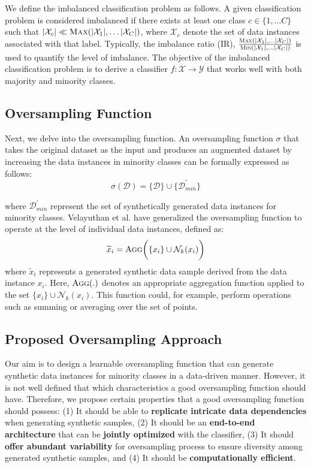 We define the imbalanced classification problem as follows. A given classification problem is considered imbalanced if there exists at least one class $c \in \{1, \ldots C \}$ such that $|\mathcal{X}_c| \ll \textsc{Max}(|\mathcal{X}_1|, \dots |\mathcal{X}_C|)$, where $\mathcal{X}_c$ denote the set of data instances associated with that label. Typically, the imbalance ratio (IR), $\frac{\textsc{Max}(|\mathcal{X}_1|, \dots |\mathcal{X}_C|)}{\textsc{Min}(|\mathcal{X}_1|, \dots |\mathcal{X}_C|)}$ is used to quantify the level of imbalance. The objective of the imbalanced classification problem is to derive a classifier $f: \mathcal{X} \rightarrow \mathcal{Y}$ that works well with both majority and minority classes. 

\subsection{Oversampling Function}

Next, we delve into the oversampling function. An oversampling function $\sigma$ that takes the original dataset as the input and produces an augmented dataset by increasing the data instances in minority classes can be  formally expressed as follows:
\begin{equation}
    \sigma(\mathcal{D}) = \{\mathcal{D}\} \cup \{\mathcal{D}^{'}_{min}\}
\end{equation}

where $\mathcal{D}^{'}_{min}$ represent the set of synthetically generated  data instances for minority classes. Velayuthan et al. \cite{velayuthan2023revisiting} have generalized the oversampling function to operate at the level of individual data instances, defined as:
\begin{equation}
    \widetilde{x}_i = \textsc{Agg}\bigg( \{x_i\} \cup \mathcal{N}_k(x_i) \bigg)
\end{equation}
where \( \widetilde{x}_i \) represents a generated synthetic data sample derived from the data instance \( x_i \). Here, \( \textsc{Agg}(.) \) denotes an appropriate aggregation function applied to the set \( \{x_i\} \cup \mathcal{N}_k(x_i) \). This function could, for example, perform
operations such as summing or averaging over the set of points.


\subsection{Proposed Oversampling Approach}

Our aim is to design a learnable oversampling function that can generate synthetic data instances for minority classes in a data-driven manner. However, it is not well defined that which characteristics a good oversampling function should have. Therefore, we propose certain properties that a good oversampling function should possess: (1) It should be able to  \textbf{replicate intricate data dependencies} when generating synthetic samples, (2) It should be an \textbf{end-to-end architecture} that can be \textbf{jointly optimized} with the classifier, (3) It should \textbf{offer abundant variability} for oversampling process to ensure diversity among generated synthetic samples, and (4) It should be \textbf{computationally efficient}.

